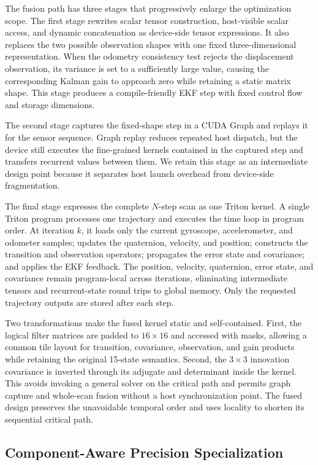 \documentclass[research]{fcs}
\begin{document}
The fusion path has three stages that progressively enlarge the optimization scope. The first stage rewrites scalar tensor construction, host-visible scalar access, and dynamic concatenation as device-side tensor expressions. It also replaces the two possible observation shapes with one fixed three-dimensional representation. When the odometry consistency test rejects the displacement observation, its variance is set to a sufficiently large value, causing the corresponding Kalman gain to approach zero while retaining a static matrix shape. This stage produces a compile-friendly EKF step with fixed control flow and storage dimensions.

The second stage captures the fixed-shape step in a CUDA Graph and replays it for the sensor sequence. Graph replay reduces repeated host dispatch, but the device still executes the fine-grained kernels contained in the captured step and transfers recurrent values between them. We retain this stage as an intermediate design point because it separates host launch overhead from device-side fragmentation.

The final stage expresses the complete $N$-step scan as one Triton kernel. A single Triton program processes one trajectory and executes the time loop in program order. At iteration $k$, it loads only the current gyroscope, accelerometer, and odometer samples; updates the quaternion, velocity, and position; constructs the transition and observation operators; propagates the error state and covariance; and applies the EKF feedback. The position, velocity, quaternion, error state, and covariance remain program-local across iterations, eliminating intermediate tensors and recurrent-state round trips to global memory. Only the requested trajectory outputs are stored after each step.

Two transformations make the fused kernel static and self-contained. First, the logical filter matrices are padded to $16\times16$ and accessed with masks, allowing a common tile layout for transition, covariance, observation, and gain products while retaining the original 15-state semantics. Second, the $3\times3$ innovation covariance is inverted through its adjugate and determinant inside the kernel. This avoids invoking a general solver on the critical path and permits graph capture and whole-scan fusion without a host synchronization point. The fused design preserves the unavoidable temporal order and uses locality to shorten its sequential critical path.

\subsection{Component-Aware Precision Specialization}
\label{subsec:mixed-precision}
\end{document}
